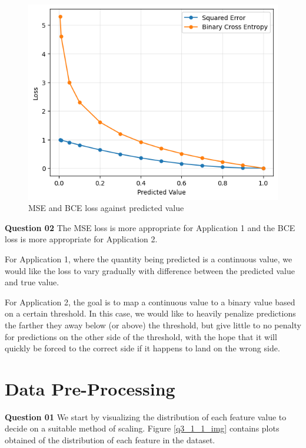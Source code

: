 \documentclass{article}[a4paper]
\begin{document}
	\begin{figure}[H]
		\centering
		\includegraphics[width=0.9\linewidth]{images/q2_1.png}
		\caption{MSE and BCE loss against predicted value}
		\label{q2_1_img}
	\end{figure}

	\textbf{Question 02} The MSE loss is more appropriate for Application 1 and the BCE loss is more appropriate for Application 2.
	\newline

	For Application 1, where the quantity being predicted is a continuous value, we would like the loss to vary gradually with 
	difference between the predicted value and true value.
	\newline
	
	For Application 2, the goal is to map a continuous value to a binary value based on a certain threshold. In this case, we would like
	to heavily penalize predictions the farther they away below (or above) the threshold, but give little to no penalty for predictions
	on the other side of the threshold, with the hope that it will quickly be forced to the correct side if it happens to land on the
	wrong side.

	\section{Data Pre-Processing}

	\textbf{Question 01} We start by visualizing the distribution of each feature value to decide on a suitable method of scaling. Figure
	\ref{q3_1_1_img} contains plots obtained of the distribution of each feature in the dataset.
\end{document}
